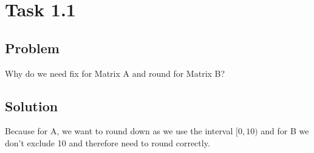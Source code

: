 \section*{Task 1.1}

\subsection*{Problem}
Why do we need fix for Matrix A and round for Matrix B?

\subsection*{Solution}
Because for A, we want to round down as we use the interval $[0,10)$ and for B we don't exclude 10 and therefore need to round correctly.


